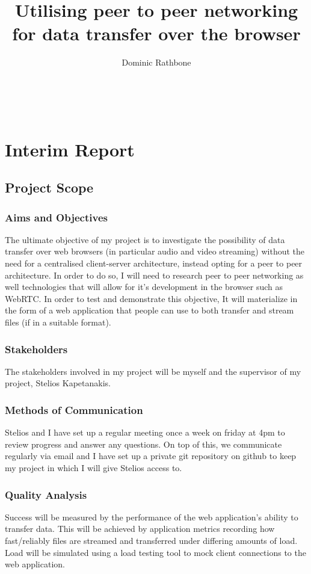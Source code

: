 \documentclass[]{report}
\title{Utilising peer to peer networking for data transfer over the browser}
\author{Dominic Rathbone}
\begin{document}
\maketitle
\tableofcontents
\


\chapter*{Interim Report}
	\section{Project Scope}
		\subsection*{Aims and Objectives}
			The ultimate objective of my project is to investigate the possibility of data transfer over web browsers (in particular audio and video streaming) without the need for a centralised client-server architecture, instead opting for a peer to peer architecture. In order to do so, I will need to research peer to peer networking as well technologies that will allow for it's development in the browser such as WebRTC. In order to test and demonstrate this objective, It will materialize in the form of a web application that people can use to both transfer and stream files (if in a suitable format).
		\subsection*{Stakeholders}
			The stakeholders involved in my project will be myself and the supervisor of my project, Stelios Kapetanakis.
		\subsection*{Methods of Communication}
			Stelios and I have set up a regular meeting once a week on friday at 4pm to review progress and answer any questions. On top of this, we communicate regularly via email and I have set up a private git repository on github to keep my project in which I will give Stelios access to.
		\subsection*{Quality Analysis}
			Success will be measured by the performance of the web application's ability to transfer data. This will be achieved by application metrics recording how fast/reliably files are streamed and transferred under differing amounts of load. Load will be simulated using a load testing tool to mock client connections to the web application.
		
\end{document}
